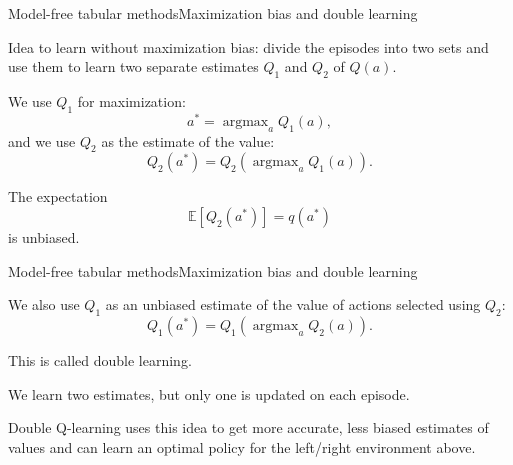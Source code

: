 \documentclass{beamer}
\DeclareMathOperator*{\argmax}{argmax}
\begin{document}
\begin{frame}{Model-free tabular methods}{Maximization bias and double learning}

  Idea to learn without maximization bias: divide the episodes into \alert{two
    sets} and use them to learn two separate estimates $Q_1$ and $Q_2$ of
  $Q(a)$.

  \medskip

  We use $Q_1$ for maximization: $$a^* = \argmax_a Q_1(a),$$
  and we use $Q_2$ as the estimate of the value:
  $$Q_2(a^*) = Q_2(\argmax_a Q_1(a)).$$

  The expectation $$\mathbb{E}\left[ Q_2(a^*) \right] = q(a^*)$$ is
  unbiased.
  
\end{frame}


\begin{frame}{Model-free tabular methods}{Maximization bias and double learning}

  We also use $Q_1$ as an unbiased estimate of the value of actions selected
  using $Q_2$: $$Q_1(a^*)=Q_1(\argmax_a Q_2(a)).$$

  This is called \alert{double learning}.

  \medskip

  We learn two estimates, but only one is updated on each episode.

  \medskip

  \alert{Double Q-learning} uses this idea to get more accurate, less
  biased estimates of values and can learn an optimal policy for the
  left/right environment above.
  
\end{frame}
\end{document}
